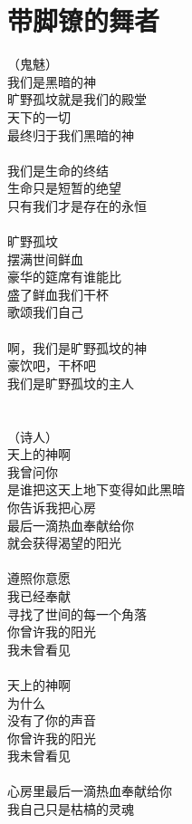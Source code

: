\section{带脚镣的舞者}
\leftskip=25mm
\noindent（鬼魅）\\
我们是黑暗的神\\
旷野孤坟就是我们的殿堂\\
天下的一切\\
最终归于我们黑暗的神\\
\\
我们是生命的终结\\
生命只是短暂的绝望\\
只有我们才是存在的永恒\\
\\
旷野孤坟\\
摆满世间鲜血\\
豪华的筵席有谁能比\\
盛了鲜血我们干杯\\
歌颂我们自己\\
\\
啊，我们是旷野孤坟的神\\
豪饮吧，干杯吧\\
我们是旷野孤坟的主人\\
\\
\\
（诗人）\\
天上的神啊\\
我曾问你\\
是谁把这天上地下变得如此黑暗\\
你告诉我把心房\\
最后一滴热血奉献给你\\
就会获得渴望的阳光\\
\\
遵照你意愿\\
我已经奉献\\
寻找了世间的每一个角落\\
你曾许我的阳光\\
我未曾看见\\
\\
天上的神啊\\
为什么\\
没有了你的声音\\
你曾许我的阳光\\
我未曾看见\\
\\
心房里最后一滴热血奉献给你\\
我自己只是枯槁的灵魂\\
